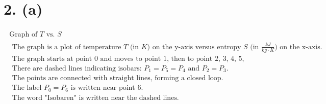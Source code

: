 \section*{2. (a)}

\[
\begin{array}{c}
\begin{array}{c|c}
\text{Graph of } T \text{ vs. } S & \\
\hline
\begin{array}{c}
\text{The graph is a plot of temperature } T \text{ (in } K \text{) on the y-axis versus entropy } S \text{ (in } \frac{kJ}{kg \cdot K} \text{) on the x-axis.} \\
\text{The graph starts at point 0 and moves to point 1, then to point 2, 3, 4, 5, and finally to point 6.} \\
\text{There are dashed lines indicating isobars: } P_1 = P_5 = P_4 \text{ and } P_2 = P_3. \\
\text{The points are connected with straight lines, forming a closed loop.} \\
\text{The label } P_0 = P_6 \text{ is written near point 6.} \\
\text{The word "Isobaren" is written near the dashed lines.}
\end{array}
\end{array}
\end{array}
\]